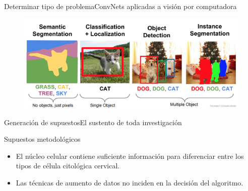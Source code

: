 \documentclass{beamer}
\begin{document}
    \begin{frame}{Determinar tipo de problema}{ConvNets aplicadas a visión por computadora}
        \begin{figure}[]
            \centering
            \includegraphics[width=\textwidth]{tipos}
          \end{figure}
    \end{frame}
    \begin{frame}{Generación de supuestos}{El sustento de toda investigación}
        \begin{block}{Supuestos metodológicos}{
            \begin{itemize}
                \item El núcleo celular contiene suficiente información para
                diferenciar entre los tipos de célula citológica cervical.
                \item Las técnicas de aumento de datos no inciden en la decisión
                del algoritmo.
            \end{itemize}
        }
        \end{block}
    \end{frame}
\end{document}
